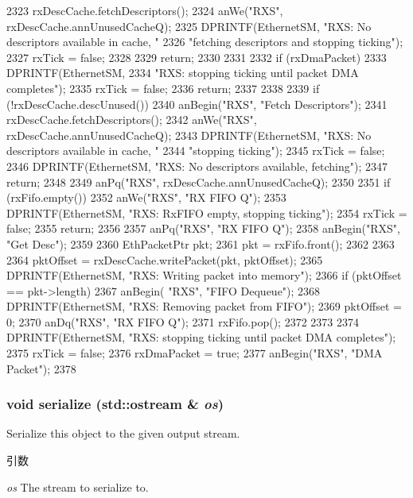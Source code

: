 \begin{DoxyCode}
{{{2323             rxDescCache.fetchDescriptors();
2324             anWe("RXS", rxDescCache.annUnusedCacheQ);
2325             DPRINTF(EthernetSM, "RXS: No descriptors available in cache, "
2326                     "fetching descriptors and stopping ticking\n");
2327             rxTick = false;
2328         }
2329         return;
2330     }
2331 
2332     if (rxDmaPacket) {
2333         DPRINTF(EthernetSM,
2334                 "RXS: stopping ticking until packet DMA completes\n");
2335         rxTick = false;
2336         return;
2337     }
2338 
2339     if (!rxDescCache.descUnused()) {
2340         anBegin("RXS", "Fetch Descriptors");
2341         rxDescCache.fetchDescriptors();
2342         anWe("RXS", rxDescCache.annUnusedCacheQ);
2343         DPRINTF(EthernetSM, "RXS: No descriptors available in cache, "
2344                 "stopping ticking\n");
2345         rxTick = false;
2346         DPRINTF(EthernetSM, "RXS: No descriptors available, fetching\n");
2347         return;
2348     }
2349     anPq("RXS", rxDescCache.annUnusedCacheQ);
2350 
2351     if (rxFifo.empty()) {
2352         anWe("RXS", "RX FIFO Q");
2353         DPRINTF(EthernetSM, "RXS: RxFIFO empty, stopping ticking\n");
2354         rxTick = false;
2355         return;
2356     }
2357     anPq("RXS", "RX FIFO Q");
2358     anBegin("RXS", "Get Desc");
2359 
2360     EthPacketPtr pkt;
2361     pkt = rxFifo.front();
2362 
2363 
2364     pktOffset = rxDescCache.writePacket(pkt, pktOffset);
2365     DPRINTF(EthernetSM, "RXS: Writing packet into memory\n");
2366     if (pktOffset == pkt->length) {
2367         anBegin( "RXS", "FIFO Dequeue");
2368         DPRINTF(EthernetSM, "RXS: Removing packet from FIFO\n");
2369         pktOffset = 0;
2370         anDq("RXS", "RX FIFO Q");
2371         rxFifo.pop();
2372     }
2373 
2374     DPRINTF(EthernetSM, "RXS: stopping ticking until packet DMA completes\n");
2375     rxTick = false;
2376     rxDmaPacket = true;
2377     anBegin("RXS", "DMA Packet");
2378 }
\end{DoxyCode}
\hypertarget{classIGbE_a53e036786d17361be4c7320d39c99b84}{
\subsubsection[{serialize}]{\setlength{\rightskip}{0pt plus 5cm}void serialize (std::ostream \& {\em os})}}
\label{classIGbE_a53e036786d17361be4c7320d39c99b84}
Serialize this object to the given output stream. 
\begin{DoxyParams}{引数}
\item[{\em os}]The stream to serialize to. \end{DoxyParams}


